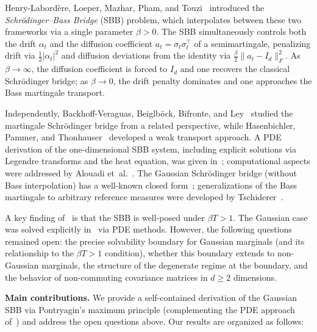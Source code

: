 \documentclass[12pt]{article}
\theoremstyle{definition}
\begin{document}
Henry-Labord\`ere, Loeper, Mazhar, Pham, and Touzi~\cite{HLMPT26} introduced
the \emph{Schr\"odinger--Bass Bridge} (SBB) problem, which interpolates between
these two frameworks via a single parameter $\beta > 0$.
The SBB simultaneously controls both the drift $\alpha_t$ and the diffusion
coefficient $a_t = \sigma_t \sigma_t^\top$ of a semimartingale, penalizing
drift via $\frac{1}{2}|\alpha_t|^2$ and diffusion deviations from the identity
via $\frac{\beta}{2}\|a_t - I_d\|_F^2$.
As $\beta\to\infty$, the diffusion coefficient is forced to $I_d$ and one
recovers the classical Schr\"odinger bridge; as $\beta\to 0$, the drift penalty
dominates and one approaches the Bass martingale transport.

Independently, Backhoff-Veraguas, Beiglb\"ock, Bifronte, and Ley~\cite{BBBL26}
studied the martingale Schr\"odinger bridge from a related perspective, while
Hasenbichler, Pammer, and Thonhauser~\cite{HPT26} developed a weak transport
approach.
A PDE derivation of the one-dimensional SBB system, including explicit
solutions via Legendre transforms and the heat equation, was given
in~\cite{PDE26}; computational aspects were addressed by Alouadi
et~al.~\cite{LSBB26}.
The Gaussian Schr\"odinger bridge (without Bass interpolation) has a
well-known closed form~\cite{Bunne23,CGP16};
generalizations of the Bass martingale to arbitrary reference measures
were developed by Tschiderer~\cite{Tsch24}.

A key finding of~\cite{HLMPT26} is that the SBB is well-posed under
$\beta T > 1$.
The Gaussian case was solved explicitly in~\cite{PDE26} via PDE methods.
However, the following questions remained open:
the precise solvability boundary for Gaussian marginals (and its
relationship to the $\beta T > 1$ condition), whether this boundary
extends to non-Gaussian marginals, the structure of the degenerate
regime at the boundary, and the behavior of non-commuting covariance
matrices in $d \ge 2$ dimensions.

\medskip

\noindent\textbf{Main contributions.}
We provide a self-contained derivation of the Gaussian SBB via Pontryagin's
maximum principle (complementing the PDE approach of~\cite{PDE26}) and
address the open questions above.
Our results are organized as follows:
\end{document}
